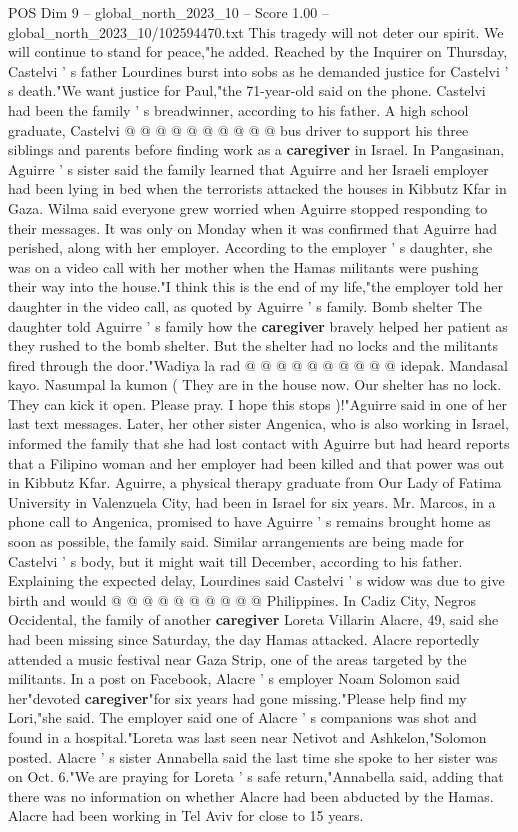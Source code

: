 \begin{textsample}{POS Dim 9 – global\_north\_2023\_10 – Score 1.00 – global\_north\_2023\_10/102594470.txt}
This tragedy will not deter our spirit.
We will continue to stand for peace,"he added.
Reached by the Inquirer on Thursday, Castelvi ' s father Lourdines burst into sobs as he demanded justice for Castelvi ' s death."We want justice for Paul,"the 71-year-old said on the phone.
Castelvi had been the family ' s breadwinner, according to his father.
A high school graduate, Castelvi @ @ @ @ @ @ @ @ @ @ bus driver to support his three siblings and parents before finding work as a \textbf{caregiver} in Israel.
In Pangasinan, Aguirre ' s sister said the family learned that Aguirre and her Israeli employer had been lying in bed when the terrorists attacked the houses in Kibbutz Kfar in Gaza.
Wilma said everyone grew worried when Aguirre stopped responding to their messages.
It was only on Monday when it was confirmed that Aguirre had perished, along with her employer.
According to the employer ' s daughter, she was on a video call with her mother when the Hamas militants were pushing their way into the house."I think this is the end of my life,"the employer told her daughter in the video call, as quoted by Aguirre ' s family.
Bomb shelter The daughter told Aguirre ' s family how the \textbf{caregiver} bravely helped her patient as they rushed to the bomb shelter.
But the shelter had no locks and the militants fired through the door."Wadiya la rad @ @ @ @ @ @ @ @ @ @ idepak.
Mandasal kayo.
Nasumpal la kumon ( They are in the house now.
Our shelter has no lock.
They can kick it open.
Please pray.
I hope this stops )!"Aguirre said in one of her last text messages.
Later, her other sister Angenica, who is also working in Israel, informed the family that she had lost contact with Aguirre but had heard reports that a Filipino woman and her employer had been killed and that power was out in Kibbutz Kfar.
Aguirre, a physical therapy graduate from Our Lady of Fatima University in Valenzuela City, had been in Israel for six years.
Mr.
Marcos, in a phone call to Angenica, promised to have Aguirre ' s remains brought home as soon as possible, the family said.
Similar arrangements are being made for Castelvi ' s body, but it might wait till December, according to his father.
Explaining the expected delay, Lourdines said Castelvi ' s widow was due to give birth and would @ @ @ @ @ @ @ @ @ @ Philippines.
In Cadiz City, Negros Occidental, the family of another \textbf{caregiver} Loreta Villarin Alacre, 49, said she had been missing since Saturday, the day Hamas attacked.
Alacre reportedly attended a music festival near Gaza Strip, one of the areas targeted by the militants.
In a post on Facebook, Alacre ' s employer Noam Solomon said her"devoted \textbf{caregiver}"for six years had gone missing."Please help find my Lori,"she said.
The employer said one of Alacre ' s companions was shot and found in a hospital."Loreta was last seen near Netivot and Ashkelon,"Solomon posted.
Alacre ' s sister Annabella said the last time she spoke to her sister was on Oct. 6."We are praying for Loreta ' s safe return,"Annabella said, adding that there was no information on whether Alacre had been abducted by the Hamas.
Alacre had been working in Tel Aviv for close to 15 years.

\end{textsample}
